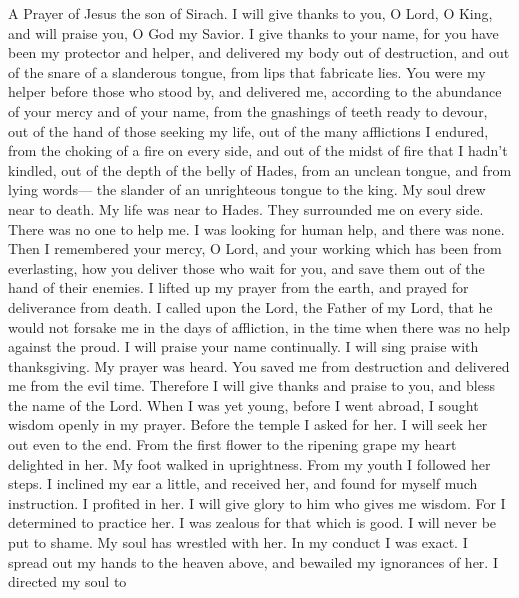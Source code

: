 A Prayer of Jesus the son of Sirach.  I will give thanks
to you, O Lord, O King, and will praise you, O God my Savior. I give
thanks to your name,  for you have been my protector and
helper, and delivered my body out of destruction, and out of the snare
of a slanderous tongue, from lips that fabricate lies. You were my
helper before those who stood by,  and delivered me,
according to the abundance of your mercy and of your name, from the
gnashings of teeth ready to devour, out of the hand of those seeking my
life, out of the many afflictions I endured,  from the
choking of a fire on every side, and out of the midst of fire that I
hadn't kindled,  out of the depth of the belly of Hades,
from an unclean tongue, and from lying words---  the
slander of an unrighteous tongue to the king. My soul drew near to
death. My life was near to Hades.  They surrounded me on
every side. There was no one to help me. I was looking for human help,
and there was none.  Then I remembered your mercy, O Lord,
and your working which has been from everlasting, how you deliver those
who wait for you, and save them out of the hand of their enemies.
 I lifted up my prayer from the earth, and prayed for
deliverance from death.  I called upon the Lord, the
Father of my Lord, that he would not forsake me in the days of
affliction, in the time when there was no help against the proud.
 I will praise your name continually. I will sing praise
with thanksgiving. My prayer was heard.  You saved me
from destruction and delivered me from the evil time. Therefore I will
give thanks and praise to you, and bless the name of the Lord.
 When I was yet young, before I went abroad, I sought
wisdom openly in my prayer.  Before the temple I asked
for her. I will seek her out even to the end.  From the
first flower to the ripening grape my heart delighted in her. My foot
walked in uprightness. From my youth I followed her steps.
 I inclined my ear a little, and received her, and found
for myself much instruction.  I profited in her. I will
give glory to him who gives me wisdom.  For I determined
to practice her. I was zealous for that which is good. I will never be
put to shame.  My soul has wrestled with her. In my
conduct I was exact. I spread out my hands to the heaven above, and
bewailed my ignorances of her.  I directed my soul to
